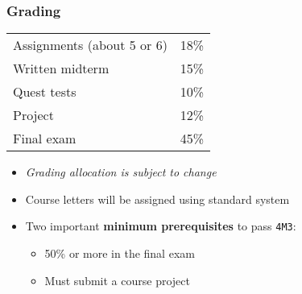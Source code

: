 \begin{frame}\frametitle{Grading}
	\begin{tabular}{ll}\\
		Assignments (about 5 or 6)     	& 18\% \\
	    Written midterm        			& 15\% \\
	    Quest tests						& 10\% \\
	    Project      					& 12\% \\
	    Final exam 						& 45\% \\
	\end{tabular}

	\vspace{12pt}
	\vspace{12pt}

	\begin{itemize}
		\item	\emph{Grading allocation is subject to change}
		\item	Course letters will be assigned using standard system
		\item	Two important \textbf{minimum prerequisites} to pass \texttt{4M3}:
		\begin{itemize}
			\item	50\% or more in the final exam
			\item	Must submit a course project
		\end{itemize}
	\end{itemize}
\end{frame}

